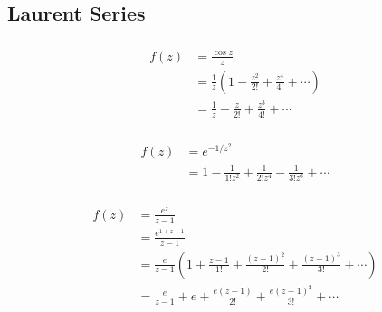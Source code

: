 \documentclass{article}
\begin{document}
\subsection{Laurent Series}

\subsubsection{}

\begin{align*}
  f(z) & = \frac{\cos z}{z}                                                        \\
       & = \frac{1}{z} \left( 1 - \frac{z^2}{2!} + \frac{z^4}{4!} + \cdots \right) \\
       & = \frac{1}{z} - \frac{z}{2!} + \frac{z^3}{4!} + \cdots
\end{align*}

\setcounter{subsubsection}{2}
\subsubsection{}

\begin{align*}
  f(z) & = e^{-1 / z^2}                                                        \\
       & = 1 - \frac{1}{1! z^2} + \frac{1}{2! z^4} - \frac{1}{3! z^6} + \cdots
\end{align*}

\setcounter{subsubsection}{4}
\subsubsection{}

\begin{align*}
  f(z) & = \frac{e^z}{z - 1}                                                                                          \\
       & = \frac{e^{1 + z - 1}}{z - 1}                                                                                \\
       & = \frac{e}{z - 1} \left( 1 + \frac{z - 1}{1!} + \frac{(z - 1)^2}{2!} + \frac{(z - 1)^3}{3!} + \cdots \right) \\
       & = \frac{e}{z - 1} + e + \frac{e (z - 1)}{2!} + \frac{e (z - 1)^2}{3!} + \cdots
\end{align*}

\setcounter{subsubsection}{6}
\subsubsection{}
\end{document}
